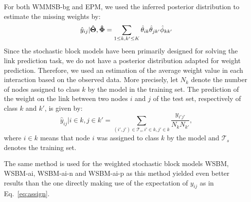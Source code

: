 For both WMMSB-bg and EPM, we used the inferred posterior distribution to estimate the missing weights by:
%
\begin{equation}\label{eq:assign}
\hat y_{ij} | \boldsymbol{\hat\Theta}, \boldsymbol{\hat\Phi} = \sum_{1 \le k,k' \le K} \hat\theta_{ik} \hat\theta_{jk'} \hat\phi_{kk'}
\end{equation}
%
%
Since the stochastic block models have been primarily designed for solving the link prediction task, we do not have a posterior distribution adapted for weight prediction. Therefore, we used an estimation of the average weight value in each interaction based on the observed data. More precisely, let $N_k$ denote the number of nodes assigned to class $k$ by the model in the training set. The prediction of the weight on the link between two nodes $i$ and $j$ of the test set, respectively of class $k$ and $k'$, is given by:
%
\[
\hat y_{ij} | i \in k, j \in k' = \sum_{(i',j') \in \mathcal{T}_s, i' \in k, j' \in k} \frac{y_{i'j'}}{N_k N_{k'}},
\]
%
where $i \in k$ means that node $i$ was assigned to class $k$ by the model and $\mathcal{T}_s$ denotes the training set.
 
The same method is used for the weighted stochastic block models WSBM, WSBM-ai, WSBM-ai-n and WSBM-ai-p as this method yielded even better results than the one directly making use of the expectation of $y_{ij}$ as in Eq.~\ref{eq:assign}.

\begin{table*}[t]
\centering
	
\label{table:mse}
\end{table*}

\begin{figure*}[ht]
\centering
	
   \label{fig:k_evolv}
\end{figure*}


